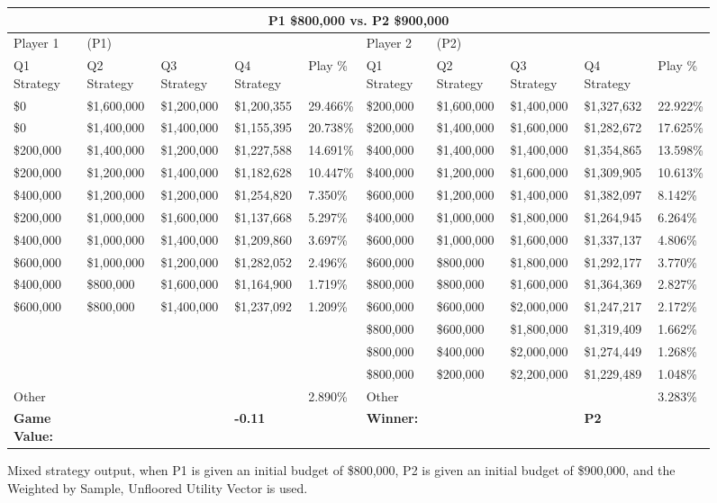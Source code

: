 \documentclass[11pt]{article}
\begin{document}
\begin{figure}
\tiny
\begin{tabular}{ |p{1.0cm}p{1.0cm}p{1.0cm}p{2.0cm}|p{1.0cm}||p{1.0cm}p{1.0cm}p{1.0cm}p{2.0cm}|p{1.0cm}|}
\hline
\multicolumn{10}{|c|}{P1 \$800,000 vs. P2 \$900,000} \\
\hline
Player 1 & (P1) & & & & Player 2 & (P2) & & & \\
\hline
Q1 Strategy & Q2 Strategy & Q3 Strategy & Q4 Strategy  &  Play \% & Q1 Strategy & Q2 Strategy & Q3 Strategy & Q4 Strategy  &  Play \%\\
\hline
\$0 & \$1,600,000 & \$1,200,000 & \$1,200,355 & 29.466\% & \$200,000 & \$1,600,000 & \$1,400,000 & \$1,327,632 & 22.922\% \\
\$0 & \$1,400,000 & \$1,400,000 & \$1,155,395 & 20.738\% & \$200,000 & \$1,400,000 & \$1,600,000 & \$1,282,672 & 17.625\% \\
\$200,000 & \$1,400,000 & \$1,200,000 & \$1,227,588 & 14.691\% & \$400,000 & \$1,400,000 & \$1,400,000 & \$1,354,865 & 13.598\% \\
\$200,000 & \$1,200,000 & \$1,400,000 & \$1,182,628 & 10.447\% & \$400,000 & \$1,200,000 & \$1,600,000 & \$1,309,905 & 10.613\% \\
\$400,000 & \$1,200,000 & \$1,200,000 & \$1,254,820 & 7.350\% & \$600,000 & \$1,200,000 & \$1,400,000 & \$1,382,097 & 8.142\% \\
\$200,000 & \$1,000,000 & \$1,600,000 & \$1,137,668 & 5.297\% & \$400,000 & \$1,000,000 & \$1,800,000 & \$1,264,945 & 6.264\% \\
\$400,000 & \$1,000,000 & \$1,400,000 & \$1,209,860 & 3.697\% & \$600,000 & \$1,000,000 & \$1,600,000 & \$1,337,137 & 4.806\% \\
\$600,000 & \$1,000,000 & \$1,200,000 & \$1,282,052 & 2.496\% & \$600,000 & \$800,000 & \$1,800,000 & \$1,292,177 & 3.770\% \\
\$400,000 & \$800,000 & \$1,600,000 & \$1,164,900 & 1.719\% & \$800,000 & \$800,000 & \$1,600,000 & \$1,364,369 & 2.827\% \\
\$600,000 & \$800,000 & \$1,400,000 & \$1,237,092 & 1.209\% & \$600,000 & \$600,000 & \$2,000,000 & \$1,247,217 & 2.172\% \\
&&&& & \$800,000 & \$600,000 & \$1,800,000 & \$1,319,409 & 1.662\% \\
&&&& & \$800,000 & \$400,000 & \$2,000,000 & \$1,274,449 & 1.268\% \\
&&&& & \$800,000 & \$200,000 & \$2,200,000 & \$1,229,489 & 1.048\% \\
\hline
Other &&&& 2.890\% & Other &&&& 3.283\% \\
\hline
\small \textbf{Game Value:} &&& \small \textbf{-0.11} && \small \textbf{Winner:} &&& \small \textbf{P2}&\\
\hline
\end{tabular}
\caption{Mixed strategy output, when P1 is given an initial budget of \$800,000, P2 is given an initial budget of \$900,000, and the Weighted by Sample, Unfloored Utility Vector is used.}
\label{8v9table.6}
\end{figure}
\end{document}
